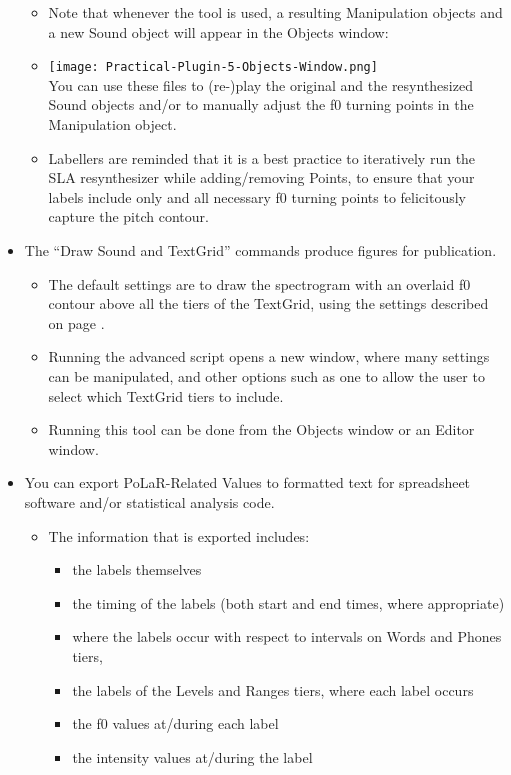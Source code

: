 \begin{itemize}
\begin{itemize}
		\item Note that whenever the tool is used, a resulting Manipulation objects and a new Sound object will appear in the Objects window:
		\item[] \texttt{[image: Practical-Plugin-5-Objects-Window.png]}\\
		You can use these files to (re-)play the original and the resynthesized Sound objects and/or to manually adjust the f0 turning points in the Manipulation object.
		\item Labellers are reminded that it is a best practice to iteratively run the SLA resynthesizer while adding\slash removing Points, to ensure that your labels include only and all necessary f0 turning points to felicitously capture the pitch contour.
	\end{itemize}
	\item The “Draw Sound and TextGrid” commands produce figures for publication.
	\begin{itemize}
		\item The default settings are to draw the spectrogram with an overlaid f0 contour above all the tiers of the TextGrid, using the settings described on page \pageref{note on praat settings}.
		\item Running the advanced script opens a new window, where many settings can be manipulated, and other options such as one to allow the user to select which TextGrid tiers to include.
		\item Running this tool can be done from the Objects window or an Editor window.
	\end{itemize}
	\item You can export PoLaR-Related Values to formatted text for spreadsheet software and/or statistical analysis code.
	\begin{itemize}
		\item The information that is exported includes:
			\begin{itemize}
			\item the labels themselves
			\item the timing of the labels (both start and end times, where appropriate)
			\item where the labels occur with respect to intervals on Words and Phones tiers, 
			\item the labels of the Levels and Ranges tiers, where each label occurs
			\item the f0 values at\slash during each label
			\item the intensity values at\slash during the label

\end{itemize}
\end{itemize}
\end{itemize}
